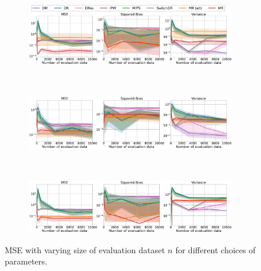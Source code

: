 \begin{figure}[h!]
    \centering
	\begin{subfigure}{0.8\textwidth}
	    \centering
	    \includegraphics[width=1\textwidth]{figures/mr/mips_experiments/ope_vs_neval_nac_250_alphatar_0_8_dimc_5000.png}
	    \label{subfig:d-1000-na-250-neval-mips}
	\end{subfigure}\\
	\begin{subfigure}{0.8\textwidth} 
	    \centering
	    \includegraphics[width=1\textwidth]{figures/mr/mips_experiments/ope_vs_neval_nac_100_alphatar_0_8_dimc_1000.png}
	    \label{subfig:d-5000-na-250-neval-08-mips}
	\end{subfigure}\\
	\begin{subfigure}{0.8\textwidth} 
	    \centering
	    \includegraphics[width=1\textwidth]{figures/mr/mips_experiments/ope_vs_neval_nac_250_alphatar_1_0_dimc_5000.png}
	    \label{subfig:d-5000-na-250-neval-1-mips}
	\end{subfigure}
    \caption{MSE with varying size of evaluation dataset $n$ for different choices of parameters.}
    \label{fig:mse-vs-neval-mips}
\end{figure}

